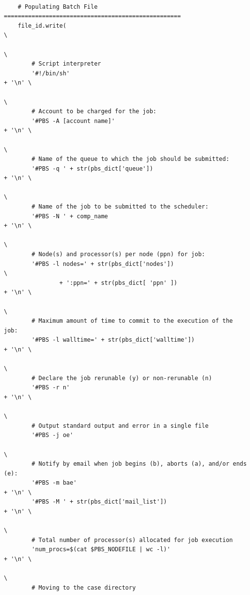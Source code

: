 \documentclass[11pt]{article}
\begin{document}
\begin{lstlisting}[style=BashInputStyle]
    
    # Populating Batch File  ===================================================
    file_id.write(                                                             \
                                                                               \
        # Script interpreter
        '#!/bin/sh'                                                     + '\n' \
                                                                               \
        # Account to be charged for the job:
        '#PBS -A [account name]'                                          + '\n' \
                                                                               \
        # Name of the queue to which the job should be submitted:
        '#PBS -q ' + str(pbs_dict['queue'])                             + '\n' \
                                                                               \
        # Name of the job to be submitted to the scheduler:
        '#PBS -N ' + comp_name                                          + '\n' \
                                                                               \
        # Node(s) and processor(s) per node (ppn) for job:
        '#PBS -l nodes=' + str(pbs_dict['nodes'])                              \
                + ':ppn=' + str(pbs_dict[ 'ppn' ])                       + '\n' \
                                                                               \
        # Maximum amount of time to commit to the execution of the job:
        '#PBS -l walltime=' + str(pbs_dict['walltime'])                 + '\n' \
                                                                               \
        # Declare the job rerunable (y) or non-rerunable (n)
        '#PBS -r n'                                                     + '\n' \
                                                                               \
        # Output standard output and error in a single file
        '#PBS -j oe'
                                                                               \
        # Notify by email when job begins (b), aborts (a), and/or ends (e):
        '#PBS -m bae'                                                   + '\n' \
        '#PBS -M ' + str(pbs_dict['mail_list'])                         + '\n' \
                                                                               \
        # Total number of processor(s) allocated for job execution
        'num_procs=$(cat $PBS_NODEFILE | wc -l)'                        + '\n' \
                                                                               \
        # Moving to the case directory

\end{lstlisting}
\end{document}
